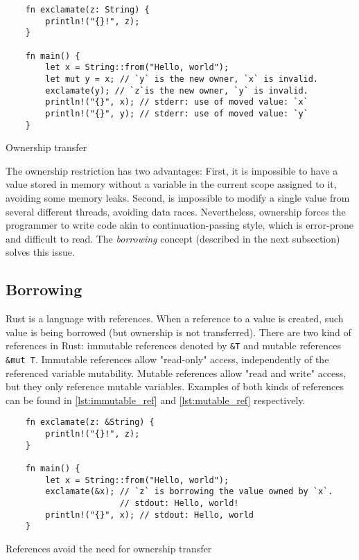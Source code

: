 \begin{listing}[ht]
	\begin{verbatim}
    fn exclamate(z: String) {
        println!("{}!", z);
    }

    fn main() {
        let x = String::from("Hello, world");
        let mut y = x; // `y` is the new owner, `x` is invalid.
        exclamate(y); // `z`is the new owner, `y` is invalid.
        println!("{}", x); // stderr: use of moved value: `x`
        println!("{}", y); // stderr: use of moved value: `y`
    }
	\end{verbatim}
  \caption{Ownership transfer}
  \label{lst:ownership}
\end{listing}

The ownership restriction has two advantages: First, it is impossible to have a value stored in memory without a variable in the current scope assigned to it, avoiding some memory leaks. Second, is impossible to modify a single value from several different threads, avoiding data races. Nevertheless, ownership forces the programmer to write code akin to continuation-passing style, which is error-prone and difficult to read. The \textit{borrowing} concept (described in the next subsection) solves this issue.

\subsection{Borrowing}
Rust is a language with references. When a reference to a value is created, such value is being borrowed (but ownership is not transferred). There are two kind of references in Rust: immutable references denoted by \texttt{\&T} and mutable references \texttt{\&mut T}. Immutable references allow "read-only" access, independently of the referenced variable mutability. Mutable references allow "read and write" access, but they only reference mutable variables. Examples of both kinds of references can be found in \ref{lst:immutable_ref} and \ref{lst:mutable_ref} respectively.

\begin{listing}[ht]
	\begin{verbatim}
    fn exclamate(z: &String) {
        println!("{}!", z);
    }

    fn main() {
        let x = String::from("Hello, world");
        exclamate(&x); // `z` is borrowing the value owned by `x`.
                       // stdout: Hello, world! 
        println!("{}", x); // stdout: Hello, world
    }
	\end{verbatim}
  \caption{References avoid the need for ownership transfer}
  \label{lst:immutable_ref}
\end{listing}

